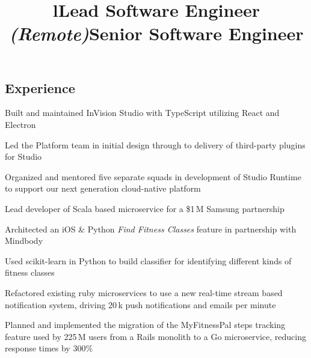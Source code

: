 \documentclass[12pt, tweaklist, line]{res}
\title{l}\dates{r}\\
\let\tempone\itemize
\let\temptwo\enditemize
\renewenvironment{itemize}{\tempone\vspace{-.15in}\setlength{\topsep}{0pt}\setlength{\itemsep}{3pt}\vspace{-.15in}}{\temptwo}
\begin{document}

\begin{resume}

\section{Experience}

\title{Lead Software Engineer \em{(Remote)}}
\begin{position}
\begin{itemize}
\item Built and maintained InVision Studio with TypeScript utilizing React and Electron
\item Led the Platform team in initial design through to delivery of third-party plugins for Studio
\item Organized and mentored five separate squads in development of Studio Runtime to support our next generation cloud-native platform
\end{itemize}
\end{position}

\title{Senior Software Engineer}
\begin{position}
\begin{itemize}
\item Lead developer of Scala based microservice for a \$1\,M Samsung partnership
\item Architected an iOS \& Python \textit{Find Fitness Classes} feature in partnership with Mindbody
\item Used scikit-learn in Python to build classifier for identifying different kinds of fitness classes
\item Refactored existing ruby microservices to use a new real-time stream based notification system, driving 20\,k push notifications and emails per minute
\item Planned and implemented the migration of the MyFitnessPal steps tracking feature used by 225\,M users from a Rails monolith to a Go microservice, reducing response times by 300\%
\end{itemize}
\end{position}


\end{resume}
\end{document}
